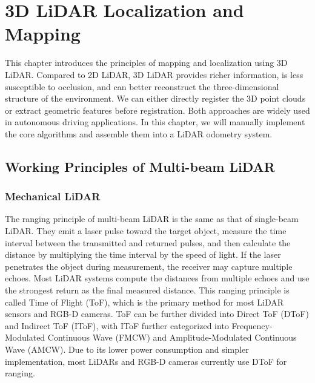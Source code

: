 \thispagestyle{empty}
\chapter{3D LiDAR Localization and Mapping}
\thispagestyle{empty}

This chapter introduces the principles of mapping and localization using 3D LiDAR. Compared to 2D LiDAR, 3D LiDAR provides richer information, is less susceptible to occlusion, and can better reconstruct the three-dimensional structure of the environment. We can either directly register the 3D point clouds or extract geometric features before registration. Both approaches are widely used in autonomous driving applications. In this chapter, we will manually implement the core algorithms and assemble them into a LiDAR odometry system.



\section{Working Principles of Multi-beam LiDAR}
\subsection{Mechanical LiDAR}
The ranging principle of multi-beam LiDAR is the same as that of single-beam LiDAR. They emit a laser pulse toward the target object, measure the time interval between the transmitted and returned pulses, and then calculate the distance by multiplying the time interval by the speed of light. If the laser penetrates the object during measurement, the receiver may capture multiple echoes. Most LiDAR systems compute the distances from multiple echoes and use the strongest return as the final measured distance. This ranging principle is called Time of Flight (ToF), which is the primary method for most LiDAR sensors and RGB-D cameras. ToF can be further divided into Direct ToF (DToF) and Indirect ToF (IToF), with IToF further categorized into Frequency-Modulated Continuous Wave (FMCW) and Amplitude-Modulated Continuous Wave (AMCW). Due to its lower power consumption and simpler implementation, most LiDARs and RGB-D cameras currently use DToF for ranging.

